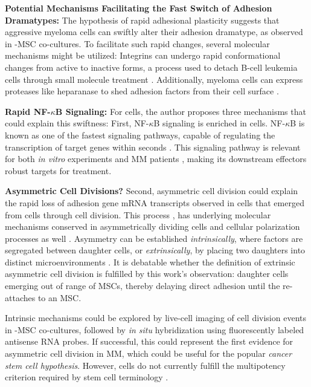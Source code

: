 \textbf{Potential Mechanisms Facilitating the Fast Switch of Adhesion Dramatypes:}
The hypothesis of rapid adhesional plasticity suggests that aggressive myeloma
cells can swiftly alter their adhesion dramatype, as observed in \INA-\ac{MSC}
co-cultures. To facilitate such rapid changes, several molecular mechanisms
might be utilized: Integrins can undergo rapid conformational changes from
active to inactive forms, a process used to detach B-cell leukemia cells through
small molecule treatment \cite{ruanVitroVivoEffects2022}. Additionally, myeloma
cells can express proteases like heparanase to shed adhesion factors from their
cell surface \cite{yangHeparanasePromotesSpontaneous2005}.

\textbf{Rapid NF-$\kappa$B Signaling:}
For \INA cells, the author proposes three mechanisms that could explain this
swiftness: First, NF-$\kappa$B signaling is enriched in \MAina cells.
NF-$\kappa$B is known as one of the fastest signaling pathways, capable of
regulating the transcription of target genes within seconds
\cite{gallego-sellesFastRegulationNFkB2022,
      zarnegarNoncanonicalNFkBActivation2008}. This signaling pathway is relevant for
both \textit{in vitro} experiments and MM patients
\cite{sarinEvaluatingEfficacyMultiple2020}, making its downstream effectors
robust targets for treatment.

\textbf{Asymmetric Cell Divisions?}
Second, asymmetric cell division could explain the rapid loss of adhesion gene
mRNA transcripts observed in \nMAina cells that emerged from \MAina cells
through cell division. This process , has
underlying molecular mechanisms conserved in asymmetrically dividing
cells and cellular polarization processes as well \cite{inabaAsymmetricStemCell2012,
      stjohnstonCellPolarityEggs2010}. Asymmetry can be established
\emph{intrinsically}, where factors are segregated between daughter cells, or
\emph{extrinsically}, by placing two daughters into distinct microenvironments
\cite{inabaAsymmetricStemCell2012}. It is debatable whether the definition of
extrinsic asymmetric cell division is fulfilled by this work's observation:
\nMAina daughter cells emerging out of range of \acp{MSC}, thereby delaying
direct adhesion until the \nMAina re-attaches to an \ac{MSC}.

Intrinsic mechanisms could be explored by live-cell imaging of cell division
events in \INA-\ac{MSC} co-cultures, followed by \textit{in situ} hybridization
using fluorescently labeled antisense RNA probes. If successful, this could
represent the first evidence for asymmetric cell division in MM, which could be
useful for the popular \emph{cancer stem cell hypothesis}. However, \MAina cells
do not currently fulfill the multipotency criterion required by stem cell
terminology \cite{johnsenMyelomaStemCell2016, liAsymmetricCellDivision2022}.


